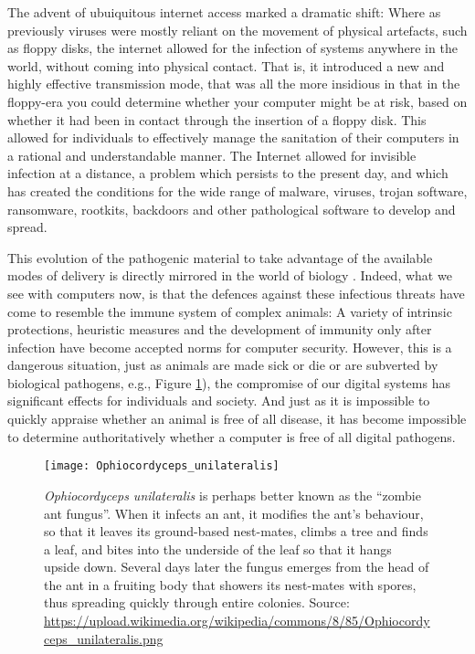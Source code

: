 The advent of ubuiquitous internet access marked a dramatic shift:  Where as previously viruses were mostly reliant on the
movement of physical artefacts, such as floppy disks, the internet allowed for the infection of systems anywhere in the
world, without coming into physical contact.
That is, it introduced a new and highly effective transmission mode, that was all the more insidious in that in the floppy-era
you could determine whether your computer might be at risk, based on whether it had been in contact through the insertion of
a floppy disk.
This allowed for individuals to effectively manage the sanitation of their computers in a rational and understandable manner.
The Internet allowed for invisible infection at a distance, a problem which persists to the present day, and which has created
the conditions for the wide range of malware, viruses, trojan software, ransomware, rootkits, backdoors and other pathological
software to develop and spread.

This evolution of the pathogenic material to take advantage of the available modes of delivery is directly mirrored in the
world of biology \cite{antonovics2017evolution}.
Indeed, what we see with computers now, is that the defences against these infectious threats have come to resemble the
immune system of complex animals: A variety of intrinsic protections, heuristic measures and the development of immunity only
after infection have become accepted norms for computer security.
However, this is a dangerous situation, just as animals are made sick or die or are subverted by biological pathogens, e.g., Figure \ref{fig:antzombies}), the
compromise of our digital systems has significant effects for individuals and society.  And just as it is impossible to quickly
appraise whether an animal is free of all disease, it has become impossible to determine authoritatively whether a computer
is free of all digital pathogens.

\begin{figure}
  \centering
  \texttt{[image: Ophiocordyceps\_unilateralis]}
  \caption{
    {\em Ophiocordyceps unilateralis} is perhaps better known as the ``zombie ant fungus''.  When it infects an ant,
    it modifies the ant's behaviour, so that it leaves its ground-based nest-mates, climbs a tree and finds a leaf,
    and bites into the underside of the leaf so that it hangs upside down. Several days later the fungus emerges from
    the head of the ant in a fruiting body that showers its nest-mates with spores, thus spreading quickly through
    entire colonies.  Source: 
    \url{https://upload.wikimedia.org/wikipedia/commons/8/85/Ophiocordyceps_unilateralis.png}
    \label{fig:antzombies}
  }
    
\end{figure}

